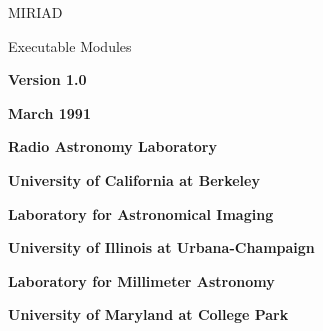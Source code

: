 %
\phantom{MIRIAD}

\nopagenumbers
\vskip 0.5in \centerline{\biggest MIRIAD}
\vskip 0.5in \centerline{\biggest Executable Modules}
\vskip 1.0in \centerline{\bf Version 1.0}
\vskip 0.25in\centerline{\bf March 1991}
\vfill

\centerline{\bf Radio Astronomy Laboratory}
\centerline{\bf University of California at Berkeley}
\vskip 0.25in
\centerline{\bf Laboratory for Astronomical Imaging}
\centerline{\bf University of Illinois at Urbana-Champaign}
\vskip 0.25in
\centerline{\bf Laboratory for Millimeter Astronomy}
\centerline{\bf University of Maryland at College Park}
\vskip 0.25in
\eject

